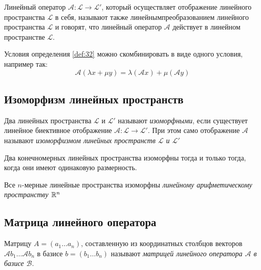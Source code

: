 Линейный оператор $\mathcal{A}: \mathcal{L} \to \mathcal{L}'$, который осуществляет отображение линейного пространства $\mathcal{L}$ в себя, называют также $линейным преобразованием$ линейного пространства $\mathcal{L}$ и говорят, что линейный оператор $\mathcal{A}$ действует в линейном пространстве $\mathcal{L}$.

\begin{note}
  Условия определения \ref{def:32} можно скомбинировать в виде одного условия, например так: \[
  \mathcal{A}(\lambda x + \mu y) = \lambda (\mathcal{A} x) + \mu (\mathcal{A} y)
  \] 
\end{note}

\subsection{Изоморфизм линейных пространств}

\begin{definition}
  Два линейных пространства $\mathcal{L}$ и $\mathcal{L}'$ называют \textit{изоморфными}, если существует линейное биективное отображение $\mathcal{A}: \mathcal{L} \to \mathcal{L}'$. При этом само отображение $\mathcal{A}$ называют \textit{изоморфизмом линейных пространств $\mathcal{L}$ и $\mathcal{L}'$} 
\end{definition}

\begin{theorem}
  Два конечномерных линейных пространства изоморфны тогда и только тогда, когда они имеют одинаковую размерность.
\end{theorem}
\begin{consequence}
  Все $n$-мерные линейные пространства изоморфны  \textit{линейному арифметическому пространству} $\mathbb{R}^n$ 
\end{consequence}

\subsection{Матрица линейного оператора}

\begin{definition}
  Матрицу $A = (a_1 \ldots a_n)$, составленную из координатных столбцов векторов $\mathcal{A} b_1 \ldots \mathcal{A} b_n$ в базисе $b = \left( b_1 \ldots b_n \right)$ называют \textit{матрицей линейного оператора $\mathcal{A}$ в базисе $\mathcal{B}$}.
\end{definition}

